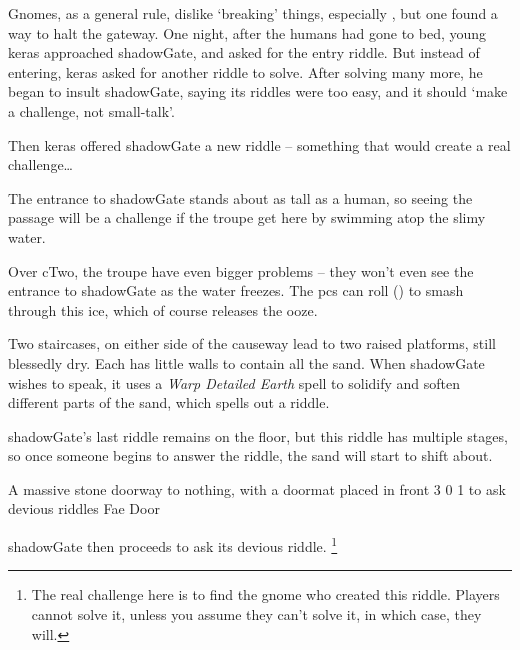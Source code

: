 \begin{multicols}{2}
\begin{exampletext}
  Gnomes, as a general rule, dislike `breaking' things, especially , but one found a way to halt the gateway.
  One night, after the humans had gone to bed, young \gls{keras} approached \gls{shadowGate}, and asked for the entry riddle.
  But instead of entering, \gls{keras} asked for another riddle to solve.
  After solving many more, he began to insult \gls{shadowGate}, saying its riddles were too easy, and it should `make a challenge, not small-talk'.

  Then \gls{keras} offered \gls{shadowGate} a new riddle -- something that would create a real challenge\ldots
\end{exampletext}

The entrance to \gls{shadowGate} stands about as tall as a human, so seeing the passage will be a challenge if the troupe get here by swimming atop the slimy water.

Over \gls{cTwo}, the troupe have even bigger problems -- they won't even see the entrance to \gls{shadowGate} as the water freezes.
The \glspl{pc} can roll  (\tn[10]) to smash through this ice, which of course releases the ooze.

Two staircases, on either side of the causeway lead to two raised platforms, still blessedly dry.
Each has little walls to contain all the sand.
When \gls{shadowGate} wishes to speak, it uses a \textit{Warp Detailed Earth} spell to solidify and soften different parts of the sand, which spells out a riddle.

\Gls{shadowGate}'s last riddle remains on the floor, but this riddle has multiple stages, so once someone begins to answer the riddle, the sand will start to shift about.

  {A massive stone doorway to nothing, with a doormat placed in front}%
  {3}%
  {0}%
  {1}%
  {to ask devious riddles}%
  {Fae Door}%
  {
    \setcounter{Fire}{2}
    \setcounter{Earth}{3}
    \setcounter{Water}{1}
    \setcounter{Academics}{2}
    \setcounter{Caving}{1}
    \setcounter{Xenomology}{1}
  }%

\showStdSpells[
  \setcounter{diceNo}{0}
]

\Gls{shadowGate} then proceeds to ask its devious riddle.%
\footnote{The real challenge here is to find the gnome who created this riddle. Players cannot solve it, unless you assume they can't solve it, in which case, they will.}

\hardestRiddleEver


\end{multicols}
